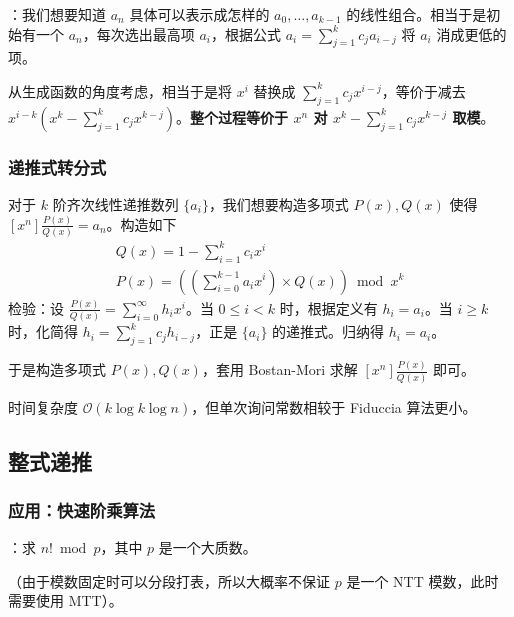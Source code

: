 ：我们想要知道 $a_n$ 具体可以表示成怎样的 $a_0, \dots, a_{k - 1}$ 的线性组合。相当于是初始有一个 $a_n$，每次选出最高项 $a_i$，根据公式 $a_i = \sum_{j = 1}^kc_ja_{i - j}$ 将 $a_i$ 消成更低的项。

从生成函数的角度考虑，相当于是将 $x^i$ 替换成 $\sum_{j = 1}^kc_jx^{i - j}$，等价于减去 $x^{i - k}\left( x^k - \sum_{j = 1}^kc_jx^{k - j} \right)$。\textbf{整个过程等价于 $x^n$ 对 $x^{k} - \sum_{j = 1}^k c_jx^{k - j}$ 取模}。


\subsubsection{递推式转分式}

对于 $k$ 阶齐次线性递推数列 $\{a_i\}$，我们想要构造多项式 $P(x), Q(x)$ 使得 $[x^n]\frac{P(x)}{Q(x)} = a_n$。构造如下
\[
\begin{gathered}
Q(x) = 1 - \sum_{i = 1}^kc_ix^i \\
P(x) = \left(\left(\sum_{i = 0}^{k - 1} a_ix^i \right) \times Q(x)\right) \bmod{x^k}
\end{gathered}
\]
检验：设 $\frac{P(x)}{Q(x)} = \sum_{i = 0}^{\infty} h_ix^i$。当 $0 \leq i < k$ 时，根据定义有 $h_i = a_i$。当 $i \geq k$ 时，化简得 $h_i = \sum_{j = 1}^k c_jh_{i - j}$，正是 $\{a_i\}$ 的递推式。归纳得 $h_i = a_i$。

于是构造多项式 $P(x), Q(x)$，套用 Bostan-Mori 求解 $[x^n]\frac{P(x)}{Q(x)}$ 即可。

时间复杂度 $\mathcal{O}(k \log k \log n)$，但单次询问常数相较于 Fiduccia 算法更小。


\subsection{整式递推}

\subsubsection{应用：快速阶乘算法}

：求 $n! \bmod p$，其中 $p$ 是一个大质数。

（由于模数固定时可以分段打表，所以大概率不保证 $p$ 是一个 NTT 模数，此时需要使用 MTT）。

